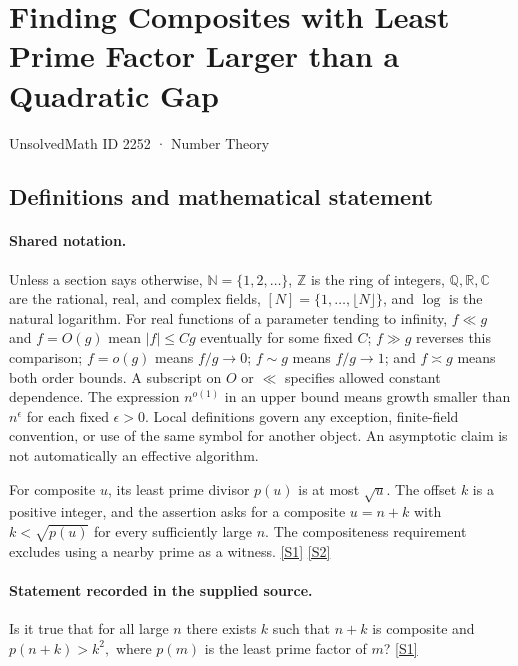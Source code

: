 \documentclass[11pt,a4paper]{article}
\newcommand{\N}{\mathbb{N}}
\newcommand{\Z}{\mathbb{Z}}
\newcommand{\Q}{\mathbb{Q}}
\newcommand{\R}{\mathbb{R}}
\newcommand{\C}{\mathbb{C}}
\newcommand{\sref}[2]{\hyperlink{source:#1:#2}{[S#2]}}
\begin{document}

\setcounter{section}{2251}

\section{Finding Composites with Least Prime Factor Larger than a Quadratic Gap}\label{2252}

{\small\sffamily UnsolvedMath ID 2252 · Number Theory}

\subsection{Definitions and mathematical statement}

\paragraph{Shared notation.}Unless a section says otherwise, $\N=\{1,2,\ldots\}$,
$\Z$ is the ring of integers, $\Q,\R,\C$ are the rational, real, and complex
fields, $[N]=\{1,\ldots,\lfloor N\rfloor\}$, and $\log$ is the natural
logarithm. For real functions of a parameter tending to infinity,
$f\ll g$ and $f=O(g)$ mean $|f|\leq Cg$ eventually for some fixed $C$;
$f\gg g$ reverses this comparison; $f=o(g)$ means $f/g\to0$;
$f\sim g$ means $f/g\to1$; and $f\asymp g$ means both order bounds.
A subscript on $O$ or $\ll$ specifies allowed constant dependence.
The expression $n^{o(1)}$ in an upper bound means growth smaller than
$n^\epsilon$ for each fixed $\epsilon>0$. Local definitions govern any
exception, finite-field convention, or use of the same symbol for another
object. An asymptotic claim is not automatically an effective algorithm.



For composite $u$, its least prime divisor $p(u)$ is at most $\sqrt u$. The offset $k$ is a positive integer, and the assertion asks for a composite $u=n+k$ with $k<\sqrt{p(u)}$ for every sufficiently large $n$. The compositeness requirement excludes using a nearby prime as a witness. \sref{2252}{1} \sref{2252}{2}

\paragraph{Statement recorded in the supplied source.}
Is it true that for all large $n$ there exists $k$ such that $n+k$ is composite and $ p(n+k)>k^2, $ where $p(m)$ is the least prime factor of $m$? \sref{2252}{1}
\end{document}
